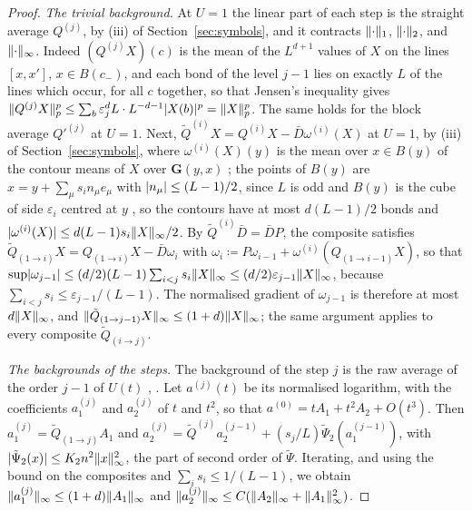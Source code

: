 \documentclass[11pt]{preprint}
\DeclarePairedDelimiter{\abs}{\lvert}{\rvert}
\DeclarePairedDelimiter{\norm}{\lVert}{\rVert}
\numberwithin{equation}{section}
\theoremstyle{definition}
\theoremstyle{remark}
\theoremstyle{plain}
\begin{document}
\begin{proof}
\emph{The trivial background.} At $U = 1$ the linear part of each step is the straight average $Q^{(j)}$, by (iii) of Section~\ref{sec:symbols}, and it contracts $\norm{\cdot}_1$, $\norm{\cdot}_2$, and $\norm{\cdot}_\infty$. Indeed $(Q^{(j)}X)(c)$ is the mean of the $L^{d+1}$ values of $X$ on the lines $[x, x']$, $x \in B(c_-)$, and each bond of the level $j - 1$ lies on exactly $L$ of the lines which occur, for all $c$ together, so that Jensen's inequality gives $\norm{Q^{(j)}X}_p^p \leq \sum_b\varepsilon_j^dL\cdot L^{-d-1}\abs{X(b)}^p = \norm{X}_p^p$. The same holds for the block average $Q'^{(j)}$ at $U = 1$. Next, $\tilde Q^{(i)}X = Q^{(i)}X - \bar D\omega^{(i)}(X)$ at $U = 1$, by (iii) of Section~\ref{sec:symbols}, where $\omega^{(i)}(X)(y)$ is the mean over $x \in B(y)$ of the contour means of $X$ over $\mathbf G(y, x)$ \cite[(0.8)]{BalabanRG1}; the points of $B(y)$ are $x = y + \sum_\mu s_in_\mu e_\mu$ with $\abs{n_\mu} \leq (L - 1)/2$, since $L$ is odd \cite[p.~251]{BalabanRG1} and $B(y)$ is the cube of side $\varepsilon_i$ centred at $y$ \cite[(0.3), p.~252]{BalabanRG1}, so the contours have at most $d(L - 1)/2$ bonds and $\abs{\omega^{(i)}(X)} \leq d(L - 1)s_i\norm{X}_\infty/2$. By $\tilde Q^{(i)}\bar D = \bar DP$, the composite satisfies $\tilde Q_{(1 \to i)}X = Q_{(1 \to i)}X - \bar D\omega_i$ with $\omega_i \coloneqq P\omega_{i-1} + \omega^{(i)}(Q_{(1 \to i-1)}X)$, so that $\sup\abs{\omega_{j-1}} \leq (d/2)(L - 1)\sum_{i<j}s_i\norm{X}_\infty \leq (d/2)\varepsilon_{j-1}\norm{X}_\infty$, because $\sum_{i<j}s_i \leq \varepsilon_{j-1}/(L - 1)$. The normalised gradient of $\omega_{j-1}$ is therefore at most $d\norm{X}_\infty$, and $\norm{\tilde Q_{(1 \to j-1)}X}_\infty \leq (1 + d)\norm{X}_\infty$; the same argument applies to every composite $\tilde Q_{(i \to j)}$.

\emph{The backgrounds of the steps.} The background of the step $j$ is the raw average of the order $j - 1$ of $U(t)$ \cite[(3.15), p.~393]{BalabanPBG}, \cite[(91), p.~31]{BalabanAVG}. Let $a^{(j)}(t)$ be its normalised logarithm, with the coefficients $a^{(j)}_1$ and $a^{(j)}_2$ of $t$ and $t^2$, so that $a^{(0)} = tA_1 + t^2A_2 + O(t^3)$. Then $a^{(j)}_1 = \tilde Q_{(1 \to j)}A_1$ and $a^{(j)}_2 = \tilde Q^{(j)}a^{(j-1)}_2 + (s_j/L)\tilde\Psi_2(a^{(j-1)}_1)$, with $\abs{\tilde\Psi_2(x)} \leq K_2n^2\norm{x}_\infty^2$, the part of second order of $\tilde\Psi$. Iterating, and using the bound on the composites and $\sum_is_i \leq 1/(L - 1)$, we obtain $\norm{a^{(j)}_1}_\infty \leq (1 + d)\norm{A_1}_\infty$ and $\norm{a^{(j)}_2}_\infty \leq C(\norm{A_2}_\infty + \norm{A_1}_\infty^2)$.


\end{proof}
\end{document}

